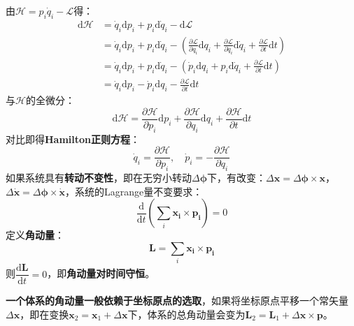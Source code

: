 \documentclass[a4paper,openany]{book}
\begin{document}
由$\mathcal{H} = p_i \dot{q}_i - \mathcal{L}$得：
\begin{align*}
    \mathrm{d}\mathcal{H}
    &= \dot{q}_i\mathrm{d}p_i + p_i\mathrm{d}\dot{q}_i - \mathrm{d}\mathcal{L} \\
    &= \dot{q}_i\mathrm{d}p_i + p_i\mathrm{d}\dot{q}_i - \left(\frac{\partial \mathcal{L}}{\partial q_i}\mathrm{d}q_i + \frac{\partial \mathcal{L}}{\partial \dot{q}_i}\mathrm{d}\dot{q}_i + \frac{\partial \mathcal{L}}{\partial t}\mathrm{d}t\right) \\
    &= \dot{q}_i\mathrm{d}p_i + p_i\mathrm{d}\dot{q}_i - \left(\dot{p}_i\mathrm{d}q_i + p_i\mathrm{d}\dot{q}_i + \frac{\partial \mathcal{L}}{\partial t}\mathrm{d}t\right) \\
    &= \dot{q}_i\mathrm{d}p_i - \dot{p}_i\mathrm{d}q_i - \frac{\partial \mathcal{L}}{\partial t}\mathrm{d}t
\end{align*}
与$\mathcal{H}$的全微分：
\[
    \mathrm{d}\mathcal{H} = \frac{\partial \mathcal{H}}{\partial p_i}\mathrm{d}p_i + \frac{\partial \mathcal{H}}{\partial q_i}\mathrm{d}q_i + \frac{\partial \mathcal{H}}{\partial t}\mathrm{d}t
\]
对比即得\textbf{Hamilton正则方程}：
\[
    \boxed{\dot{q}_i = \frac{\partial \mathcal{H}}{\partial p_i},\quad \dot{p}_i = -\frac{\partial \mathcal{H}}{\partial q_i}}
\]
如果系统具有\textbf{转动不变性}，即在无穷小转动$\Delta\bm{\phi}$下，有改变：$\Delta\bm{x} = \Delta\bm{\phi} \times \bm{x}$，$\Delta\bm{\dot{x}} = \Delta\bm{\phi} \times \bm{\dot{x}}$，系统的Lagrange量不变要求：
\[
    \frac{\mathrm{d}}{\mathrm{d}t}\left(\sum_i \bm{x_i} \times \bm{p_i}\right) = 0
\]
定义\textbf{角动量}：
\[
    \boxed{\bm{L} = \sum_i \bm{x_i} \times \bm{p_i}}
\]
则$\dfrac{\mathrm{d}\bm{L}}{\mathrm{d}t} = 0$，即\textbf{角动量对时间守恒}。

\textbf{一个体系的角动量一般依赖于坐标原点的选取}，如果将坐标原点平移一个常矢量$\Delta\bm{x}$，即在变换$\bm{x}_2 = \bm{x}_1 + \Delta\bm{x}$下，体系的总角动量会变为$\bm{L}_2 = \bm{L}_1 + \Delta\bm{x} \times \bm{p}$。
\end{document}
